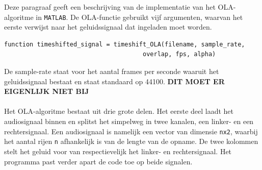 \documentclass[12pt]{report}
\begin{document}
\noindent Deze paragraaf geeft een beschrijving van de implementatie van het OLA-algoritme in \verb+MATLAB+. De OLA-functie gebruikt vijf argumenten, waarvan het eerste verwijst naar het geluidssignaal dat ingeladen moet worden.
\begin{verbatim}
function timeshifted_signal = timeshift_OLA(filename, sample_rate,
		                              overlap, fps, alpha)		                           
\end{verbatim}
De sample-rate staat voor het aantal frames per seconde waaruit het geluidssignaal bestaat en staat standaard op 44100. \textbf{DIT MOET ER EIGENLIJK NIET BIJ}
\\
\\
Het OLA-algoritme bestaat uit drie grote delen. Het eerste deel laadt het audiosignaal binnen en splitst het simpelweg in twee kanalen, een linker- en een rechtersignaal. Een audiosignaal is namelijk een vector van dimensie \verb+nx2+, waarbij het aantal rijen \verb+n+ afhankelijk is van de lengte van de opname. De twee kolommen stelt het geluid voor van respectievelijk het linker- en rechtersignaal. Het programma  past verder apart de code toe op beide signalen.\\
\end{document}
